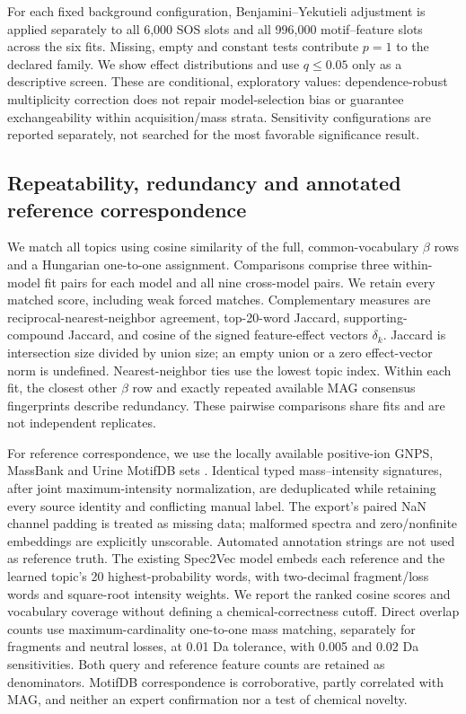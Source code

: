 \documentclass[10pt,a4paper]{article}
\begin{document}
For each fixed background configuration, Benjamini--Yekutieli adjustment
\cite{benjamini2001} is applied separately to all 6,000 SOS slots and all
996,000 motif--feature slots across the six fits. Missing, empty and constant
tests contribute $p=1$ to the declared family. We show effect distributions
and use $q\leq0.05$ only as a descriptive screen. These are conditional,
exploratory values: dependence-robust multiplicity correction does not repair
model-selection bias or guarantee exchangeability within acquisition/mass
strata. Sensitivity configurations are reported separately, not searched
for the most favorable significance result.

\subsection{Repeatability, redundancy and annotated reference correspondence}

We match all topics using cosine similarity of the full, common-vocabulary
$\beta$ rows and a Hungarian one-to-one assignment. Comparisons comprise
three within-model fit pairs for each model and all nine cross-model pairs.
We retain every matched score, including weak forced matches. Complementary
measures are reciprocal-nearest-neighbor agreement, top-20-word Jaccard,
supporting-compound Jaccard, and cosine of the signed feature-effect vectors
$\delta_k$. Jaccard is intersection size divided by union size; an empty
union or a zero effect-vector norm is undefined. Nearest-neighbor ties use
the lowest topic index. Within each fit, the closest other $\beta$ row and
exactly repeated available MAG consensus fingerprints describe redundancy.
These pairwise comparisons share fits and are not independent replicates.

For reference correspondence, we use the locally available positive-ion
GNPS, MassBank and Urine MotifDB sets \cite{rogers2019}. Identical typed
mass--intensity signatures, after joint maximum-intensity normalization, are
deduplicated while retaining every source identity and conflicting manual
label. The export's paired NaN channel padding is treated as missing data;
malformed spectra and zero/nonfinite embeddings are explicitly unscorable.
Automated annotation strings are not used as reference truth.
The existing Spec2Vec model embeds each reference and the learned topic's
20 highest-probability words, with two-decimal fragment/loss words and
square-root intensity weights. We report the ranked cosine scores and
vocabulary coverage without defining a chemical-correctness cutoff.
Direct overlap counts use maximum-cardinality one-to-one mass matching,
separately for fragments and neutral losses, at 0.01 Da tolerance, with
0.005 and 0.02 Da sensitivities. Both query and reference feature counts
are retained as denominators. MotifDB correspondence is corroborative,
partly correlated with MAG, and neither an expert confirmation nor a test
of chemical novelty.
\end{document}

